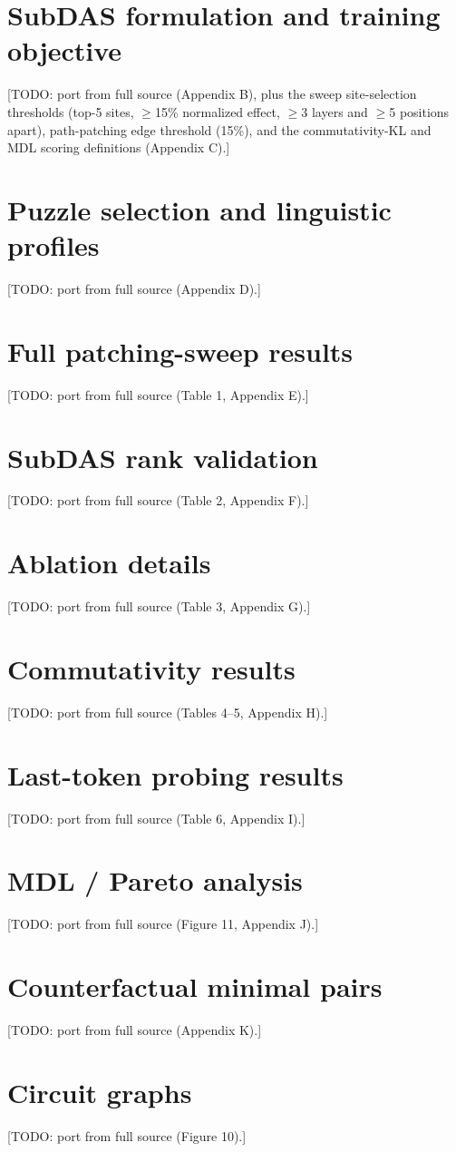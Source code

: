 \documentclass{article}
\newif\ifdraft\drafttrue
\newcommand{\TODO}[1]{\ifdraft\textcolor{red!70!black}{[TODO: #1]}\fi}
\begin{document}
\section{SubDAS formulation and training objective}
\label{app:details}
\TODO{port from full source (Appendix B), plus the sweep site-selection
thresholds (top-5 sites, $\ge$15\% normalized effect, $\ge$3 layers and
$\ge$5 positions apart), path-patching edge threshold (15\%), and the
commutativity-KL and MDL scoring definitions (Appendix C).}

\section{Puzzle selection and linguistic profiles}
\label{app:puzzles}
\TODO{port from full source (Appendix D).}

\section{Full patching-sweep results}
\label{app:sweep}
\TODO{port from full source (Table 1, Appendix E).}

\section{SubDAS rank validation}
\label{app:subdas}
\TODO{port from full source (Table 2, Appendix F).}

\section{Ablation details}
\label{app:ablations}
\TODO{port from full source (Table 3, Appendix G).}

\section{Commutativity results}
\label{app:commutativity}
\TODO{port from full source (Tables 4--5, Appendix H).}

\section{Last-token probing results}
\label{app:lasttoken}
\TODO{port from full source (Table 6, Appendix I).}

\section{MDL / Pareto analysis}
\label{app:mdl}
\TODO{port from full source (Figure 11, Appendix J).}

\section{Counterfactual minimal pairs}
\label{app:pairs}
\TODO{port from full source (Appendix K).}

\section{Circuit graphs}
\label{app:circuits}
\TODO{port from full source (Figure 10).}
\end{document}
